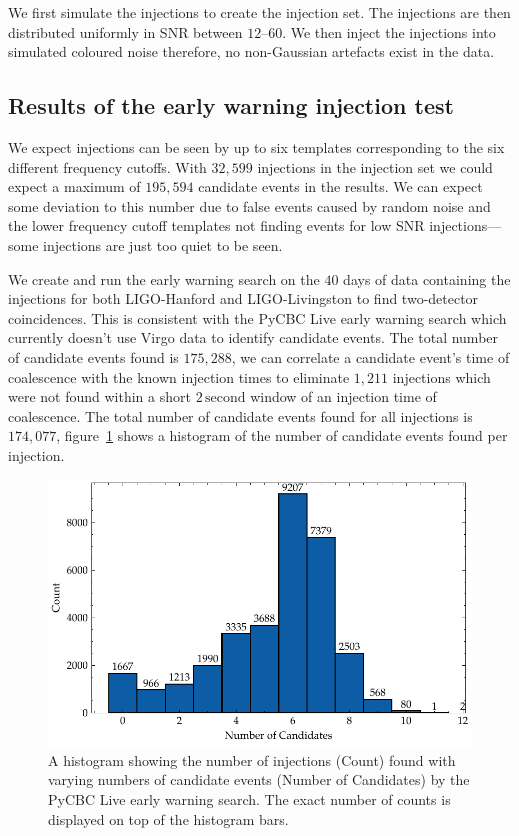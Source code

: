 We first simulate the injections to create the injection set. The injections are then distributed uniformly in SNR between $12\text{--}60$. We then inject the injections into simulated coloured noise therefore, no non-Gaussian artefacts exist in the data.

\subsection{\label{6:sec:results}Results of the early warning injection test}

We expect injections can be seen by up to six templates corresponding to the six different frequency cutoffs. With $32,599$ injections in the injection set we could expect a maximum of $195,594$ candidate events in the results. We can expect some deviation to this number due to false events caused by random noise and the lower frequency cutoff templates not finding events for low SNR injections---some injections are just too quiet to be seen.

We create and run the early warning search on the $40$ days of data containing the injections for both LIGO-Hanford and LIGO-Livingston to find two-detector coincidences. This is consistent with the PyCBC Live early warning search which currently doesn't use Virgo data to identify candidate events. The total number of candidate events found is $175,288$, we can correlate a candidate event's time of coalescence with the known injection times to eliminate $1,211$ injections which were not found within a short $2 \, \text{second}$ window of an injection time of coalescence. The total number of candidate events found for all injections is $174,077$, figure~\ref{6:fig:cand_hist} shows a histogram of the number of candidate events found per injection.
%
\begin{figure}
    \centering
    \includegraphics[width=1.0\textwidth]{images/6_earlywarning/results/count_histogram.pdf}
    \caption{A histogram showing the number of injections (Count) found with varying numbers of candidate events (Number of Candidates) by the PyCBC Live early warning search. The exact number of counts is displayed on top of the histogram bars.}
    \label{6:fig:cand_hist}
\end{figure}
%

